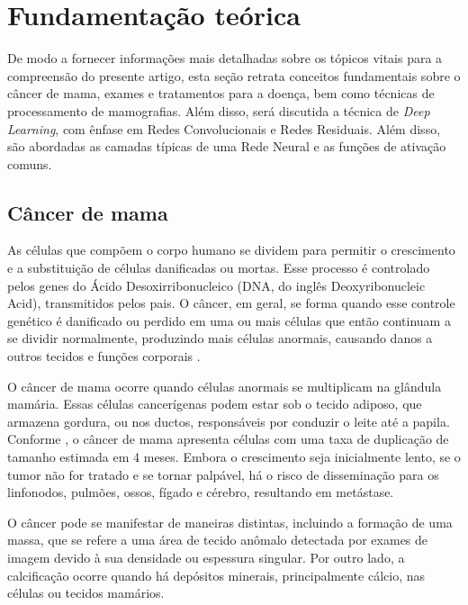 \section{\esp Fundamentação teórica}  \label{fundteorica}

De modo a fornecer informações mais detalhadas sobre os tópicos vitais para a compreensão do presente artigo, esta seção retrata conceitos fundamentais sobre o câncer de mama, exames e tratamentos para a doença, bem como técnicas de processamento de mamografias. Além disso, será discutida a técnica de \textit{Deep Learning}, com ênfase em Redes Convolucionais e Redes Residuais. Além disso, são abordadas as camadas típicas de uma Rede Neural e as funções de ativação comuns.


\subsection{\esp Câncer de mama} \label{cancerdemama}
As células que compõem o corpo humano se dividem para permitir o crescimento e a substituição de células danificadas ou mortas. Esse processo é controlado pelos genes do Ácido Desoxirribonucleico (DNA, do inglês Deoxyribonucleic Acid), transmitidos pelos pais. O câncer, em geral, se forma quando esse controle genético é danificado ou perdido em uma ou mais células que então continuam a se dividir normalmente, produzindo mais células anormais, causando danos a outros tecidos e funções corporais \cite{basicOncology}.

O câncer de mama ocorre quando células anormais se multiplicam na glândula mamária. Essas células cancerígenas podem estar sob o tecido adiposo, que armazena gordura, ou nos ductos, responsáveis por conduzir o leite até a papila. Conforme , o câncer de mama apresenta células com uma taxa de duplicação de tamanho estimada em 4 meses. Embora o crescimento seja inicialmente lento, se o tumor não for tratado e se tornar palpável, há o risco de disseminação para os linfonodos, pulmões, ossos, fígado e cérebro, resultando em metástase.

O câncer pode se manifestar de maneiras distintas, incluindo a formação de uma massa, que se refere a uma área de tecido anômalo detectada por exames de imagem devido à sua densidade ou espessura singular. Por outro lado, a calcificação ocorre quando há depósitos minerais, principalmente cálcio, nas células ou tecidos mamários.

